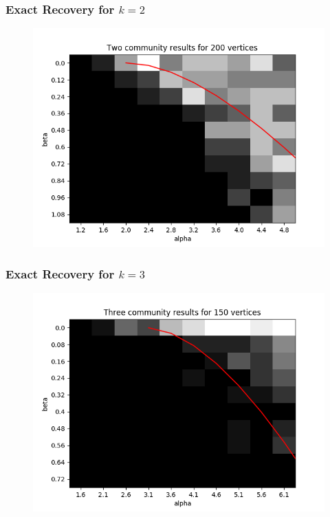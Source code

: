 \documentclass[10pt]{beamer}
\begin{document}
\begin{frame}
\frametitle{Exact Recovery for $k=2$}
\begin{figure}
  \centering
 \includegraphics[scale=.6]{../exact/final_plots/two_community_200_verts.png}
\end{figure}

\end{frame}

\begin{frame}
\frametitle{Exact Recovery for $k=3$}
\begin{figure}
  \centering
 \includegraphics[scale=.6]{../exact/final_plots/three_communities_150_verts.png}
\end{figure}

\end{frame}
\end{document}
